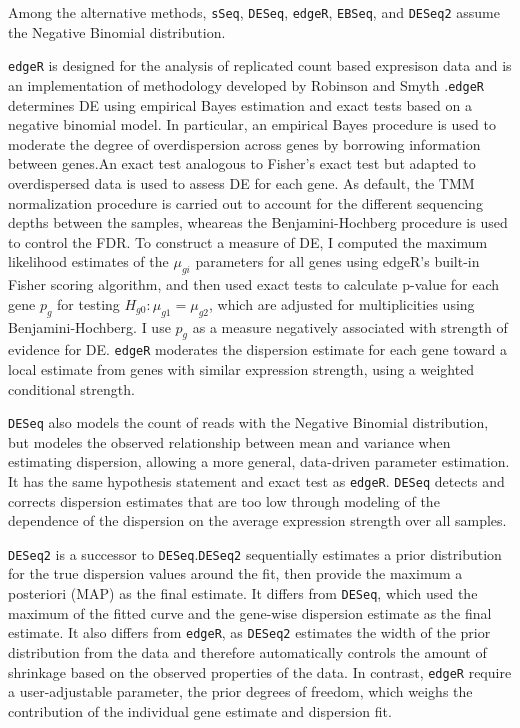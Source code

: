 \documentclass[11pt]{isuthesis}
\begin{document}
Among the alternative methods, {\tt sSeq}\citep{yu2013sseq}, {\tt DESeq}\citep{anders2010differential}, {\tt edgeR}\citep{robinson2007moderated}\citep{robinson2010edger}, {\tt EBSeq}\citep{leng2013ebseq}, and {\tt DESeq2}\citep{love2014moderated} assume the Negative Binomial distribution.


{\tt edgeR} is designed for the analysis of replicated count based expresison data and is an implementation of methodology developed by Robinson and Smyth \citep{robinson2007moderated}.{\tt edgeR} determines DE using empirical Bayes estimation and exact tests based on a negative binomial model. In particular, an empirical Bayes procedure is used to moderate the degree of overdispersion across genes by borrowing information between genes.An exact test analogous to Fisher's exact test but adapted to overdispersed data is used to assess DE for each gene. As default, the TMM normalization procedure is carried out to account for the different sequencing depths between the samples, wheareas the Benjamini-Hochberg procedure is used to control the FDR\citep{seyednasrollah2013comparison}. To construct a measure of DE, I computed the maximum likelihood estimates of the $\mu_{gi}$ parameters for all genes using edgeR's built-in Fisher scoring algorithm, and then used exact tests to calculate p-value for each gene $p_g$ for testing $H_{g0}: \mu_{g1} = \mu_{g2}$, which are adjusted for multiplicities using Benjamini-Hochberg. I use $p_g$ as a measure negatively associated with strength of evidence for DE. {\tt edgeR} moderates the dispersion estimate for each gene toward a local estimate from genes with similar expression strength, using a weighted conditional strength.

{\tt DESeq} also models the count of reads with the Negative Binomial distribution, but modeles the observed relationship between mean and variance when estimating dispersion, allowing a more general, data-driven parameter estimation\citep{seyednasrollah2013comparison}. It has the same hypothesis statement and exact test as {\tt edgeR}. {\tt DESeq} detects and corrects dispersion estimates that are too low through modeling of the dependence of the dispersion on the average expression strength over all samples. 

{\tt DESeq2} is a successor to {\tt DESeq}.{\tt DESeq2} sequentially estimates a prior distribution for the true dispersion values around the fit, then provide the maximum a posteriori (MAP) as the final estimate. It differs from {\tt DESeq}, which used the maximum of the fitted curve and the gene-wise dispersion estimate as the final estimate. It also differs from {\tt edgeR}, as {\tt DESeq2} estimates the width of the prior distribution from the data and therefore automatically controls the amount of shrinkage based on the observed properties of the data. In contrast, {\tt edgeR} require a user-adjustable parameter, the prior degrees of freedom, which weighs the contribution of the individual gene estimate and dispersion fit\citep{love2014moderated}. 
\end{document}
